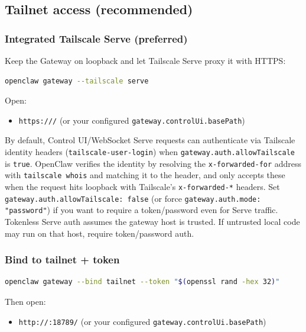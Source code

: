\subsection{Tailnet access (recommended)}


\subsubsection{Integrated Tailscale Serve (preferred)}


Keep the Gateway on loopback and let Tailscale Serve proxy it with HTTPS:

\begin{lstlisting}[language=bash]
openclaw gateway --tailscale serve
\end{lstlisting}


Open:

\begin{itemize}
  \item \texttt{https:///} (or your configured \texttt{gateway.controlUi.basePath})
\end{itemize}


By default, Control UI/WebSocket Serve requests can authenticate via Tailscale identity headers
(\texttt{tailscale-user-login}) when \texttt{gateway.auth.allowTailscale} is \texttt{true}. OpenClaw
verifies the identity by resolving the \texttt{x-forwarded-for} address with
\texttt{tailscale whois} and matching it to the header, and only accepts these when the
request hits loopback with Tailscale’s \texttt{x-forwarded-*} headers. Set
\texttt{gateway.auth.allowTailscale: false} (or force \texttt{gateway.auth.mode: "password"})
if you want to require a token/password even for Serve traffic.
Tokenless Serve auth assumes the gateway host is trusted. If untrusted local
code may run on that host, require token/password auth.

\subsubsection{Bind to tailnet + token}


\begin{lstlisting}[language=bash]
openclaw gateway --bind tailnet --token "$(openssl rand -hex 32)"
\end{lstlisting}


Then open:

\begin{itemize}
  \item \texttt{http://:18789/} (or your configured \texttt{gateway.controlUi.basePath})
\end{itemize}


